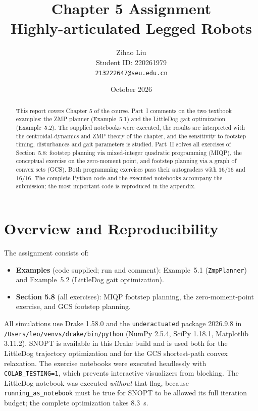 \documentclass[11pt]{article}
\title{\textbf{Chapter 5 Assignment}\\[4pt]
Highly-articulated Legged Robots}
\author{Zihao Liu\\[2pt]
Student ID: 220261979\\[2pt]
\texttt{213222647@seu.edu.cn}}
\date{October 2026}
\begin{document}
\maketitle

\begin{abstract}
This report covers Chapter 5 of the course.  Part~I comments on the two
textbook examples: the ZMP planner (Example~5.1) and the LittleDog gait
optimization (Example~5.2).  The supplied notebooks were executed, the results
are interpreted with the centroidal-dynamics and ZMP theory of the chapter,
and the sensitivity to footstep timing, disturbances and gait parameters is
studied.  Part~II solves all exercises of Section~5.8: footstep planning via
mixed-integer quadratic programming (MIQP), the conceptual exercise on the
zero-moment point, and footstep planning via a graph of convex sets (GCS).
Both programming exercises pass their autograders with $16/16$ and $16/16$.
The complete Python code and the executed notebooks accompany the submission;
the most important code is reproduced in the appendix.
\end{abstract}

\tableofcontents
\newpage

\section{Overview and Reproducibility}

The assignment consists of:
\begin{itemize}[leftmargin=1.5em]
  \item \textbf{Examples} (code supplied; run and comment): Example~5.1
        (\texttt{ZmpPlanner}) and Example~5.2 (LittleDog gait optimization).
  \item \textbf{Section 5.8} (all exercises): MIQP footstep planning, the
        zero-moment-point exercise, and GCS footstep planning.
\end{itemize}

\begin{sloppypar}
All simulations use Drake 1.58.0 and the \texttt{underactuated} package
2026.9.8 in \texttt{/Users/leo/venvs/drake/bin/python} (NumPy 2.5.4,
SciPy 1.18.1, Matplotlib 3.11.2).  SNOPT is available in this Drake build and
is used both for the LittleDog trajectory optimization and for the GCS
shortest-path convex relaxation.  The exercise notebooks were executed
headlessly with \texttt{COLAB\_TESTING=1}, which prevents interactive
visualizers from blocking.  The LittleDog notebook was executed \emph{without}
that flag, because \texttt{running\_as\_notebook} must be true for SNOPT to be
allowed its full iteration budget; the complete optimization takes
$8.3$~s.
\end{sloppypar}
\end{document}
